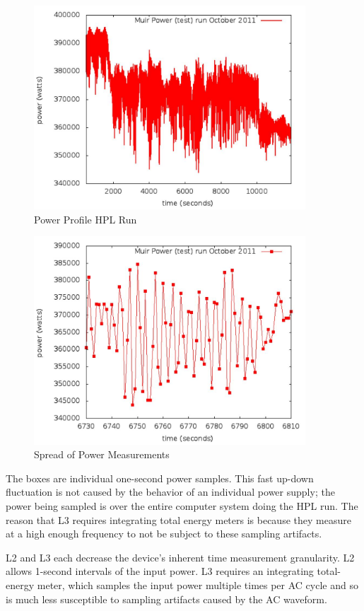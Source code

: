 \begin{figure}
\centering
\includegraphics[width=4in]{fig3-1}
\caption{Power Profile HPL Run}
\label{fig:powprof}
\end{figure}

\begin{figure}
\centering
\includegraphics[width=4in]{fig3-2}
\caption{Spread of Power Measurements}
\label{fig:sopm}
\end{figure}

\noindent
The boxes are individual one-second power samples.  This fast up-down fluctuation is not caused by the behavior of an individual power supply; the power being sampled is over the entire computer system doing the HPL run.  The reason that L3 requires integrating total energy meters is because they measure at a high enough frequency to not be subject to these sampling artifacts.
\wl

\noindent
L2 and L3 each decrease the device's inherent time measurement granularity.  L2 allows 1-second intervals of the input power.  L3 requires an integrating total-energy meter, which samples the input power multiple times per AC cycle and so is much less susceptible to sampling artifacts caused by the AC waveform.  

